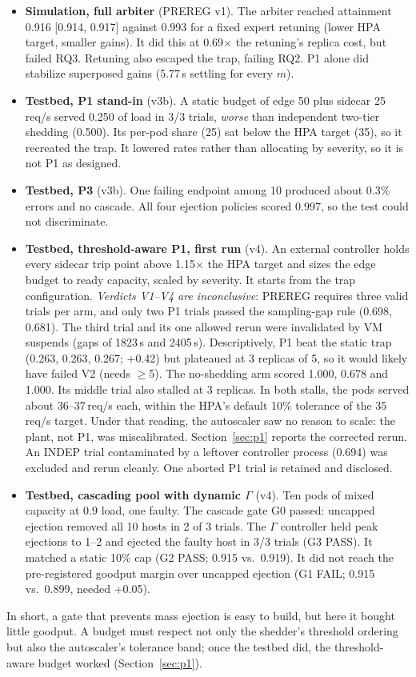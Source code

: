 \documentclass[conference]{IEEEtran}
\begin{document}
\begin{itemize}
\item \textbf{Simulation, full arbiter} (PREREG v1). The arbiter reached
attainment 0.916 [0.914, 0.917] against 0.993 for a fixed expert retuning
(lower HPA target, smaller gains). It did this at 0.69$\times$ the
retuning's replica cost, but failed RQ3. Retuning also escaped the trap,
failing RQ2. P1 alone did stabilize superposed gains (5.77\,s settling for every $m$).
\item \textbf{Testbed, P1 stand-in} (v3b). A static budget of edge 50 plus
sidecar 25\,req/s served 0.250 of load in 3/3 trials, \emph{worse} than
independent two-tier shedding (0.500). Its per-pod share (25) sat below the
HPA target (35), so it recreated the trap. It lowered rates rather than
allocating by severity, so it is not P1 as designed.
\item \textbf{Testbed, P3} (v3b). One failing endpoint among 10 produced
about 0.3\% errors and no cascade. All four ejection policies scored 0.997,
so the test could not discriminate.
\item \textbf{Testbed, threshold-aware P1, first run} (v4). An external controller
holds every sidecar trip point above 1.15$\times$ the HPA target and sizes the
edge budget to ready capacity, scaled by severity. It starts from the trap
configuration. \emph{Verdicts V1--V4 are inconclusive}: PREREG requires
three valid trials per arm, and only two P1 trials passed the
sampling-gap rule (0.698, 0.681). The third trial and its one allowed rerun
were invalidated by VM suspends (gaps of 1823\,s and 2405\,s). Descriptively, P1
beat the static trap (0.263, 0.263, 0.267; +0.42) but plateaued at 3 replicas
of 5, so it would likely have failed V2 (needs $\ge$5). The no-shedding arm
scored 1.000, 0.678 and 1.000. Its middle trial also stalled at 3 replicas.
In both stalls, the pods served about 36--37\,req/s each, within the HPA's
default 10\% tolerance of the 35\,req/s target. Under that reading, the
autoscaler saw no reason to scale: the plant, not P1, was miscalibrated.
Section~\ref{sec:p1} reports the corrected rerun. An INDEP trial contaminated by a leftover
controller process (0.694) was excluded and rerun cleanly. One aborted
P1 trial is retained and disclosed.
\item \textbf{Testbed, cascading pool with dynamic $\Gamma$} (v4). Ten pods of
mixed capacity at 0.9 load, one faulty. The cascade gate G0 passed: uncapped
ejection removed all 10 hosts in 2 of 3 trials. The $\Gamma$ controller
held peak ejections to 1--2 and ejected the faulty host in 3/3 trials (G3
PASS). It matched a static 10\% cap (G2 PASS; 0.915 vs.\ 0.919). It did not
reach the pre-registered goodput margin over uncapped ejection (G1 FAIL; 0.915
vs.\ 0.899, needed +0.05).
\end{itemize}
In short, a gate that prevents mass ejection is easy to build, but here it bought
little goodput. A budget must respect not only the shedder's threshold ordering but also
the autoscaler's tolerance band; once the testbed did, the threshold-aware
budget worked (Section~\ref{sec:p1}).
\end{document}
